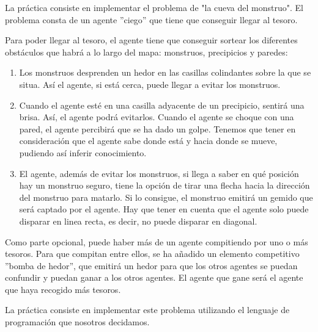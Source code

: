 La práctica consiste en implementar el problema de "la cueva del monstruo". El problema consta de un agente ''ciego'' que tiene que conseguir llegar al tesoro. 

Para poder llegar al tesoro, el agente tiene que conseguir sortear los diferentes obstáculos que habrá a lo largo del mapa: monstruos, precipicios y paredes:

\begin{enumerate}
    \item Los monstruos desprenden un hedor en las casillas colindantes sobre la que se situa. Así el agente, si está cerca, puede llegar a evitar los monstruos.
    \item Cuando el agente esté en una casilla adyacente de un precipicio, sentirá una brisa. Así, el agente podrá evitarlos. Cuando el agente se choque con una pared, el agente percibirá que se ha dado un golpe. Tenemos que tener en consideración que el agente sabe donde está y hacia donde se mueve, pudiendo así inferir conocimiento.
    \item El agente, además de evitar los monstruos, si llega a saber en qué posición hay un monstruo seguro, tiene la opción de tirar una flecha hacia la dirección del monstruo para matarlo. Si lo consigue, el monstruo emitirá un gemido que será captado por el agente. Hay que tener en cuenta que el agente solo puede disparar en linea recta, es decir, no puede disparar en diagonal.
\end{enumerate}{}

Como parte opcional, puede haber más de un agente compitiendo por uno o más tesoros. Para que compitan entre ellos, se ha añadido un elemento competitivo ''bomba de hedor'', que emitirá un hedor para que los otros agentes se puedan confundir y puedan ganar a los otros agentes. El agente que gane será el agente que haya recogido más tesoros.

La práctica consiste en implementar este problema utilizando el lenguaje de programación que nosotros decidamos.